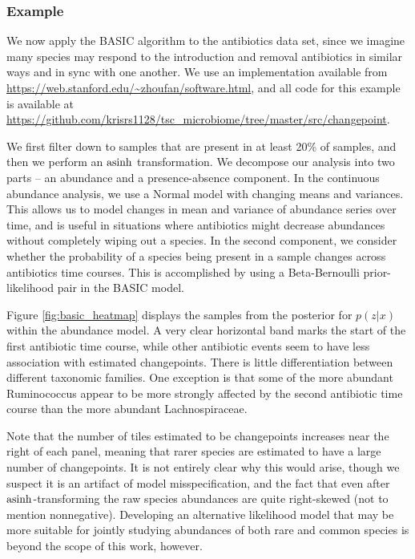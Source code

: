 
\subsubsection{Example}
\label{subsec:basic_example}

We now apply the BASIC algorithm to the antibiotics data set, since we imagine
many species may respond to the introduction and removal antibiotics in similar
ways and in sync with one another. We use an implementation available from
\url{https://web.stanford.edu/~zhoufan/software.html}, and all code for this
example is available at
\url{https://github.com/krisrs1128/tsc_microbiome/tree/master/src/changepoint}.

We first filter down to samples that are present in at least 20\% of samples,
and then we perform an $\mathop\mathrm{asinh}$ transformation. We decompose our analysis into
two parts -- an abundance and a presence-absence component. In the continuous
abundance analysis, we use a Normal model with changing means and variances.
This allows us to model changes in mean and variance of abundance series over
time, and is useful in situations where antibiotics might decrease abundances
without completely wiping out a species. In the second component, we consider
whether the probability of a species being present in a sample changes across
antibiotics time courses. This is accomplished by using a Beta-Bernoulli
prior-likelihood pair in the BASIC model.

Figure \ref{fig:basic_heatmap} displays the samples from the posterior for
$p\left(z \vert x\right)$ within the abundance model. A very clear horizontal
band marks the start of the first antibiotic time course, while other antibiotic
events seem to have less association with estimated changepoints. There is
little differentiation between different taxonomic families. One exception is
that some of the more abundant Ruminococcus appear to be more strongly affected
by the second antibiotic time course than the more abundant Lachnospiraceae.

Note that the number of tiles estimated to be changepoints increases near the
right of each panel, meaning that rarer species are estimated to have a large
number of changepoints. It is not entirely clear why this would arise, though we
suspect it is an artifact of model misspecification, and the fact that even
after $\mathop\mathrm{asinh}$-transforming the raw species abundances are quite right-skewed
(not to mention nonnegative). Developing an alternative likelihood model that
may be more suitable for jointly studying abundances of both rare and common
species is beyond the scope of this work, however.

